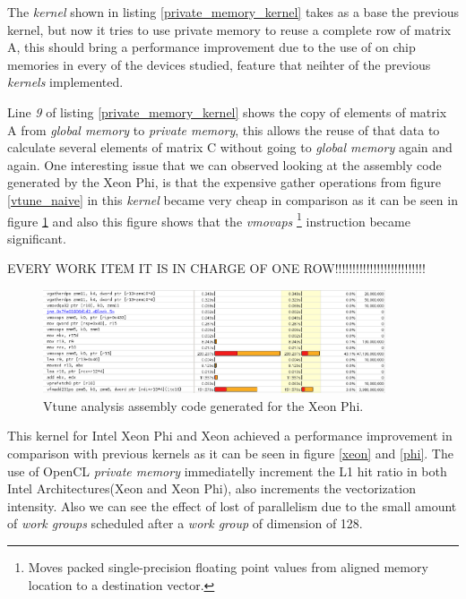 \par{The \emph{kernel} shown in listing \ref{private_memory_kernel} takes as a base the previous kernel, 
    but now it tries to use private memory to reuse a complete row of matrix A, this should bring a performance improvement
    due to the use of on chip memories in every of the devices studied, feature that neihter of the previous \emph{kernels}
    implemented.}

\par{Line \emph{9} of listing \ref{private_memory_kernel} shows the copy of elements of matrix A from \emph{global memory} to
    \emph{private memory}, this allows the reuse of that data to calculate several elements of matrix C without going to \emph{global memory}
    again and again. One interesting issue that we can observed looking at the assembly code generated by the Xeon Phi, is that the 
    expensive gather operations from figure \ref{vtune_naive} in this \emph{kernel} became very cheap in comparison as it can
    be seen in figure \ref{vtune_rows} and also this figure shows that the \emph{vmovaps} \footnote{Moves packed single-precision 
    floating point values from aligned memory location to a destination vector\cite{intrinsics}.} 
    instruction became significant.}

\par{{\color{red}EVERY WORK ITEM IT IS IN CHARGE OF ONE ROW!!!!!!!!!!!!!!!!!!!!!!!!!!}}

\begin{figure}[!h]
    \centering
    \includegraphics[width=0.9\textwidth]{figures/vtune_rows.png}
    \caption{Vtune analysis assembly code generated for the Xeon Phi.}
    \label{vtune_rows}
\end{figure}


\par{This kernel for Intel Xeon Phi and Xeon achieved a performance improvement in comparison with previous kernels as it can 
    be seen in figure \ref{xeon} and \ref{phi}. The use of OpenCL \emph{private memory} immediatelly increment the L1 hit ratio in both Intel
    Architectures(Xeon and Xeon Phi), also increments the vectorization intensity. Also we can see the effect of lost of parallelism
    due to the small amount of \emph{work groups} scheduled after a \emph{work group} of dimension of 128.}

